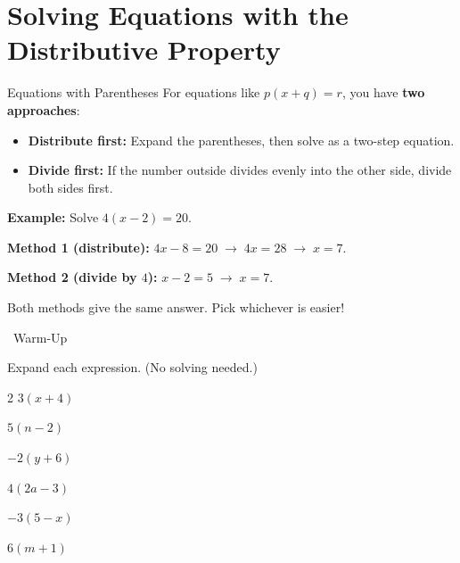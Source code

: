 \section{Solving Equations with the Distributive Property}

\begin{quickReview}{Equations with Parentheses}
For equations like $p(x + q) = r$, you have \textbf{two approaches}:
\begin{itemize}[leftmargin=*]
    \item \textbf{Distribute first:} Expand the parentheses, then solve as a two-step equation.
    \item \textbf{Divide first:} If the number outside divides evenly into the other side, divide both sides first.
\end{itemize}

\medskip
\textbf{Example:} Solve $4(x - 2) = 20$.

\textbf{Method 1 (distribute):} $4x - 8 = 20 \;\to\; 4x = 28 \;\to\; x = 7$.

\textbf{Method 2 (divide by $4$):} $x - 2 = 5 \;\to\; x = 7$.

\smallskip
Both methods give the same answer. Pick whichever is easier!
\end{quickReview}

\begin{practiceBox}[funGreen]{\faSun~Warm-Up}

Expand each expression. (No solving needed.)

\begin{multicols}{2}
\prob $3(x + 4)$ \answerBlank[3cm]

\prob $5(n - 2)$ \answerBlank[3cm]

\prob $-2(y + 6)$ \answerBlank[3cm]

\prob $4(2a - 3)$ \answerBlank[3cm]

\prob $-3(5 - x)$ \answerBlank[3cm]

\prob $6(m + 1)$ \answerBlank[3cm]
\end{multicols}
\end{practiceBox}

